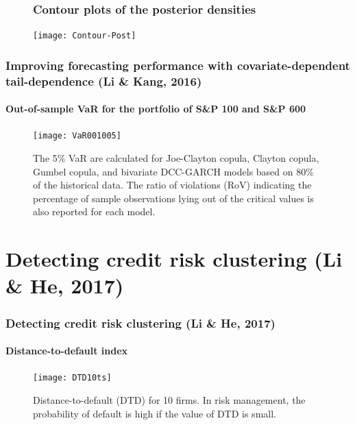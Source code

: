 \documentclass[10pt,aspectratio=169]{beamer}
\begin{document}
\begin{frame}
  \frametitle{}

  \begin{figure}[!h]
    \frametitle{Contour plots of the posterior densities}
    \centering
    \texttt{[image: Contour-Post]}
  \end{figure}

\end{frame}







\begin{frame}
  \frametitle{Improving forecasting performance with covariate-dependent tail-dependence
    (Li \& Kang, 2016)}

  \framesubtitle{Out-of-sample VaR for the portfolio of S\&P 100 and S\&P 600}

  \begin{figure}[h!]
  \centering \texttt{[image: VaR001005]}
  \caption{The 5\% VaR are calculated for Joe-Clayton copula, Clayton
    copula, Gumbel copula, and bivariate DCC-GARCH models based on 80\% of the historical
    data. The ratio of violations (RoV) indicating the percentage of sample observations
    lying out of the critical values is also reported for each model.}
  \label{fig:VaR-plot}
\end{figure}
\end{frame}





\section{Detecting credit risk clustering (Li \& He, 2017)}
\begin{frame}
  \frametitle{Detecting credit risk clustering (Li \& He,
    2017)}
  \framesubtitle{Distance-to-default index}
  \begin{figure}[!h]
    \centering
    \texttt{[image: DTD10ts]}
    \caption{Distance-to-default (DTD) for 10 firms. In risk management, the probability of
      default is high if the value of DTD is small.}
    \label{fig:DTD-for-ten-firms}
  \end{figure}

\end{frame}
\end{document}

